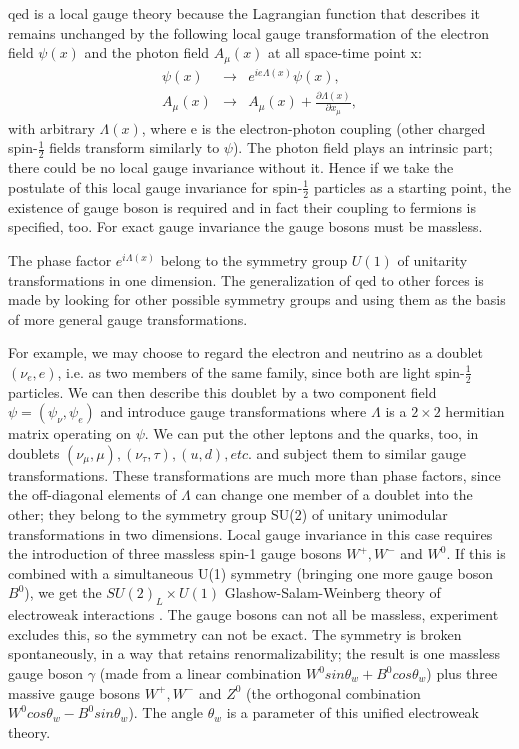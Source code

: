 {qed} is a local gauge theory because the Lagrangian function that describes it remains unchanged by the following local gauge transformation of the electron field $\psi(x)$ and the photon field $A_\mu(x)$ at all space-time point x:
	\begin{eqnarray}
	\psi(x) & \rightarrow & e^{ie\Lambda(x)}\psi(x), \nonumber \\
	A_\mu(x) & \rightarrow & A_\mu(x) + \frac{\partial \Lambda(x)}{\partial x_\mu}, \nonumber
	\end{eqnarray}
with arbitrary $\Lambda(x)$, where e is the electron-photon coupling (other charged spin-$\frac{1}{2}$ fields transform similarly to $\psi$). The photon field plays an intrinsic part; there could be no local gauge invariance without it. Hence if we take the postulate of this local gauge invariance for spin-$\frac{1}{2}$ particles as a starting point, the existence of gauge boson is required and in fact their coupling to fermions is specified, too. For exact gauge invariance the gauge bosons must be massless.

The phase factor $e^{i\Lambda(x)}$ belong to the symmetry group $U(1)$ of unitarity transformations in one dimension. The generalization of {qed} to other forces is made by looking for other possible symmetry groups and using them as the basis of more general gauge transformations. 
		
For example, we may choose to regard the electron and neutrino as a doublet $(\nu_e,e)$, i.e. as two members of the same family, since both are light spin-$\frac{1}{2}$ particles. We can then describe this doublet by a two component field $\psi = (\psi_\nu,\psi_e)$ and introduce gauge transformations where $\Lambda$ is a $2\times 2$ hermitian matrix operating on $\psi$.  We can put the other leptons and the quarks, too, in doublets $(\nu_\mu,\mu),(\nu_\tau,\tau),(u,d),etc.$ and subject them to similar gauge transformations. These transformations are much more than phase factors, since the off-diagonal elements of $\Lambda$ can change one member of a doublet into the other; they belong to the symmetry group SU(2) of unitary unimodular transformations in two dimensions. Local gauge invariance in this case requires the introduction of three massless spin-1 gauge bosons $W^+,W^-$ and $W^0$. If this is combined with a simultaneous U(1) symmetry (bringing one more gauge boson $B^0$), we get the $SU(2)_L\times U(1)$ Glashow-Salam-Weinberg theory of electroweak interactions \cite{article:weinberg}. The gauge bosons can not all be massless, experiment excludes this, so the symmetry can not be exact. The symmetry is broken spontaneously, in a way that retains renormalizability; the result is one massless gauge boson $\gamma$ (made from a linear combination $W^0sin\theta_w +B^0cos\theta_w$) plus three massive gauge bosons $W^+, W^-$ and $Z^0$ (the orthogonal combination $W^0cos\theta_w - B^0sin\theta_w$). The angle $\theta_w$ is a parameter of this unified electroweak theory.

